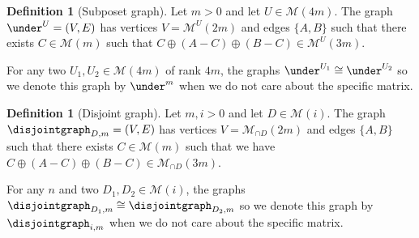 \documentclass[10pt,a4paper]{article}
\theoremstyle{definition}
\newtheorem{definition}[theorem]{Definition}
\theoremstyle{remark}
\newcommand{\set}[1]{\{#1\}}
\numberwithin{equation}{section}
\def\MP{\mathcal{M}}
\begin{document}
\begin{definition}[Subposet graph] \label{def:subposet-graph}
    Let \(m > 0\) and let \(U \in \MP(4m)\). The graph \(\under^U = (V,E)\) has vertices \(V = \MP^U(2m)\) and edges \(\set{A,B}\) such that there exists \(C \in \MP(m)\) such that \(C \oplus (A-C) \oplus (B-C) \in \MP^{U}(3m)\).
\end{definition}
For any two \(U_1,U_2 \in \MP(4m)\) of rank \(4m\), the graphs \(\under^{U_1} \cong \under^{U_2}\) so we denote this graph by \(\under^m\) when we do not care about the specific matrix.

\begin{definition}[Disjoint graph] \label{def:disjoint-graph}
    Let \(m,i > 0\) and let \(D \in \MP(i)\). The graph \(\disjointgraph_{D,m} = (V,E)\) has vertices \(V = \MP_{\cap D}(2m)\) and edges \(\set{A,B}\) such that there exists \(C \in \MP(m)\) such that we have \(C \oplus (A-C) \oplus (B-C) \in \MP_{\cap D}(3m)\).
\end{definition}
For any \(n\) and two \(D_1,D_2 \in \MP(i)\), the graphs \(\disjointgraph_{D_1,m} \cong \disjointgraph_{D_2,m}\) so we denote this graph by \(\disjointgraph_{i,m}\) when we do not care about the specific matrix.

\medskip
\end{document}
